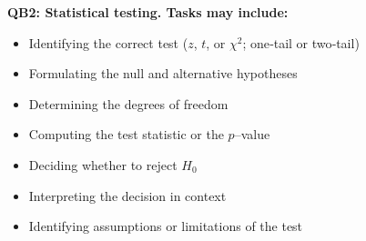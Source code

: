 \documentclass[11pt]{article}
\begin{document}
\vspace{0.5em}
\textbf{QB2: Statistical testing. Tasks may include:}
\begin{itemize}
	\item Identifying the correct test ($z$, $t$, or $\chi^2$; one‐tail or two‐tail)
	\item Formulating the null and alternative hypotheses
	\item Determining the degrees of freedom
	\item Computing the test statistic or the $p$–value
	\item Deciding whether to reject $H_0$
	\item Interpreting the decision in context
	\item Identifying assumptions or limitations of the test
\end{itemize}

\end{document}
